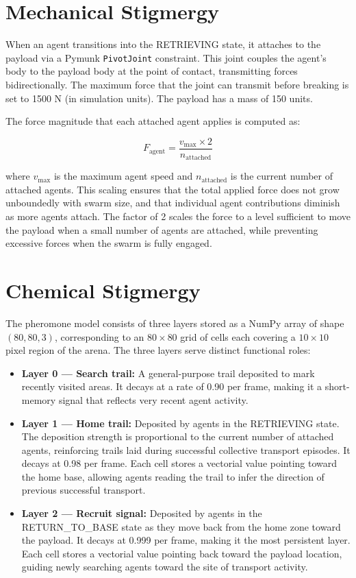 \section{Mechanical Stigmergy}
\label{sec:mech_stigmergy}

When an agent transitions into the RETRIEVING state, it attaches to the payload via a Pymunk \texttt{PivotJoint} constraint. This joint couples the agent's body to the payload body at the point of contact, transmitting forces bidirectionally. The maximum force that the joint can transmit before breaking is set to 1500 N (in simulation units). The payload has a mass of 150 units.

The force magnitude that each attached agent applies is computed as:

\begin{equation}
F_{\text{agent}} = \frac{v_{\max} \times 2}{n_{\text{attached}}}
\label{eq:force_scaling}
\end{equation}

where $v_{\max}$ is the maximum agent speed and $n_{\text{attached}}$ is the current number of attached agents. This scaling ensures that the total applied force does not grow unboundedly with swarm size, and that individual agent contributions diminish as more agents attach. The factor of 2 scales the force to a level sufficient to move the payload when a small number of agents are attached, while preventing excessive forces when the swarm is fully engaged.

\section{Chemical Stigmergy}
\label{sec:chem_stigmergy}

The pheromone model consists of three layers stored as a NumPy array of shape $(80, 80, 3)$, corresponding to an $80\times80$ grid of cells each covering a $10\times10$ pixel region of the arena. The three layers serve distinct functional roles:

\begin{itemize}
    \item \textbf{Layer 0 — Search trail:} A general-purpose trail deposited to mark recently visited areas. It decays at a rate of 0.90 per frame, making it a short-memory signal that reflects very recent agent activity.
    \item \textbf{Layer 1 — Home trail:} Deposited by agents in the RETRIEVING state. The deposition strength is proportional to the current number of attached agents, reinforcing trails laid during successful collective transport episodes. It decays at 0.98 per frame. Each cell stores a vectorial value pointing toward the home base, allowing agents reading the trail to infer the direction of previous successful transport.
    \item \textbf{Layer 2 — Recruit signal:} Deposited by agents in the RETURN\_TO\_BASE state as they move back from the home zone toward the payload. It decays at 0.999 per frame, making it the most persistent layer. Each cell stores a vectorial value pointing back toward the payload location, guiding newly searching agents toward the site of transport activity.
\end{itemize}

